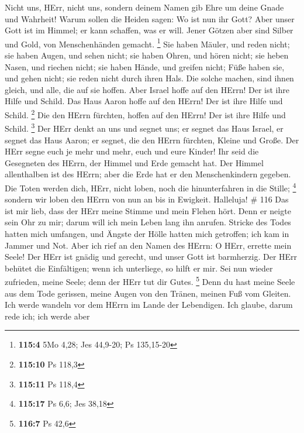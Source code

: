  Nicht uns, HErr, nicht uns, sondern deinem Namen gib Ehre
um deine Gnade und Wahrheit!  Warum sollen die Heiden sagen:
Wo ist nun ihr Gott?  Aber unser Gott ist im Himmel; er kann
schaffen, was er will.  Jener Götzen aber sind Silber und
Gold, von Menschenhänden gemacht. \footnote{\textbf{115:4} 5Mo 4,28; Jes
  44,9-20; Ps 135,15-20}  Sie haben Mäuler, und reden nicht;
sie haben Augen, und sehen nicht;  sie haben Ohren, und
hören nicht; sie heben Nasen, und riechen nicht;  sie haben
Hände, und greifen nicht; Füße haben sie, und gehen nicht; sie reden
nicht durch ihren Hals.  Die solche machen, sind ihnen
gleich, und alle, die auf sie hoffen.  Aber Israel hoffe auf
den HErrn! Der ist ihre Hilfe und Schild.  Das Haus Aaron
hoffe auf den HErrn! Der ist ihre Hilfe und Schild. \footnote{\textbf{115:10}
  Ps 118,3}  Die den HErrn fürchten, hoffen auf den HErrn!
Der ist ihre Hilfe und Schild. \footnote{\textbf{115:11} Ps 118,4}
 Der HErr denkt an uns und segnet uns; er segnet das Haus
Israel, er segnet das Haus Aaron;  er segnet, die den HErrn
fürchten, Kleine und Große.  Der HErr segne euch je mehr
und mehr, euch und eure Kinder!  Ihr seid die Gesegneten
des HErrn, der Himmel und Erde gemacht hat.  Der Himmel
allenthalben ist des HErrn; aber die Erde hat er den Menschenkindern
gegeben.  Die Toten werden dich, HErr, nicht loben, noch
die hinunterfahren in die Stille; \footnote{\textbf{115:17} Ps 6,6; Jes
  38,18}  sondern wir loben den HErrn von nun an bis in
Ewigkeit. Halleluja! \# 116  Das ist mir lieb, dass der HErr
meine Stimme und mein Flehen hört.  Denn er neigte sein Ohr
zu mir; darum will ich mein Leben lang ihn anrufen.  Stricke
des Todes hatten mich umfangen, und Ängste der Hölle hatten mich
getroffen; ich kam in Jammer und Not.  Aber ich rief an den
Namen des HErrn: O HErr, errette mein Seele!  Der HErr ist
gnädig und gerecht, und unser Gott ist barmherzig.  Der HErr
behütet die Einfältigen; wenn ich unterliege, so hilft er mir.
 Sei nun wieder zufrieden, meine Seele; denn der HErr tut
dir Gutes. \footnote{\textbf{116:7} Ps 42,6}  Denn du hast
meine Seele aus dem Tode gerissen, meine Augen von den Tränen, meinen
Fuß vom Gleiten.  Ich werde wandeln vor dem HErrn im Lande
der Lebendigen.  Ich glaube, darum rede ich; ich werde aber
